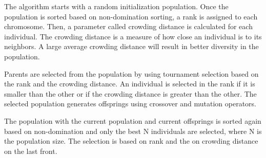 \documentclass{llncs}
\begin{document}
The algorithm starts with a random initialization population. Once the population is sorted based on non-domination sorting, a rank is assigned to each chromosome.
Then, a parameter called crowding distance is calculated for each individual. The crowding distance is a measure of how close an individual is to its neighbors. A large 
average crowding distance will result in better diversity in the population. 

Parents are selected from the population by using tournament selection based on the rank and the crowding distance. An individual is selected in the rank if it is smaller than the other or 
if the crowding distance is greater than the other. The selected population generates offsprings using crossover and mutation operators. 

The population with the current population and current offsprings is sorted again based on non-domination and only the best N individuals are selected, where N is the population size.
The selection is based on rank and the on crowding distance on the last front.

%
%
%
%
%
%
\vspace*{-1em}
\end{document}
